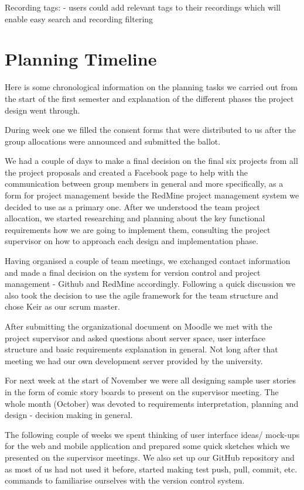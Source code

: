 \documentclass{l3proj}
\begin{document}
		Recording tags:
			- users could add relevant tags to their recordings which will enable easy search and recording filtering


\section{Planning Timeline}

Here is some chronological information on the planning tasks we carried out from the start of the first semester and explanation of the different phases the project design went through.

During week one we filled the consent forms that were distributed to us after the group allocations were announced and submitted the ballot.

We had a couple of days to make a final decision on the final six projects from all the project proposals and created a Facebook page to help with the communication between group members in general and more specifically, as a form for project management beside the RedMine project management system we decided to use as a primary one.
After we understood the team project allocation, we started researching and planning about the key functional requirements how we are going to implement them, consulting the project supervisor on how to approach each design and implementation phase.

Having organised a couple of team meetings, we exchanged contact information and made a final decision on the system for version control and project management - Github and RedMine accordingly. Following a quick discussion we also took the decision to use the agile framework for the team structure and chose Keir as our scrum master.

After submitting the organizational document on Moodle we met with the project supervisor and asked questions about server space, user interface structure and basic requirements explanation in general. Not long after that meeting we had our own development server provided by the university.

For next week at the start of November we were all designing sample user stories in the form of comic story boards to present on the supervisor meeting. The whole month (October) was devoted to requirements interpretation, planning and design - decision making in general.

The following couple of weeks we spent thinking of user interface ideas/ mock-ups for the web and mobile application and prepared some quick sketches which we presented on the supervisor meetings. We also set up our GitHub repository and as most of us had not used it before, started making test push, pull, commit, etc. commands to familiarise ourselves with the version control system. 
\end{document}

